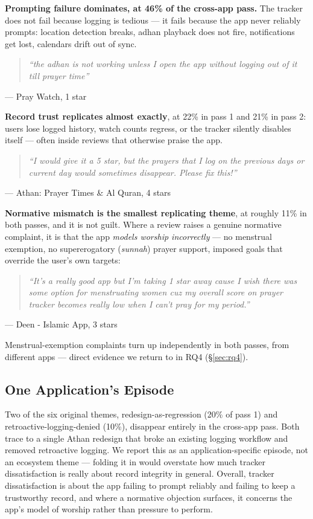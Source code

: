 \textbf{Prompting failure dominates, at 46\% of the cross-app pass.} The
tracker does not fail because logging is tedious --- it fails because the app
never reliably prompts: location detection breaks, adhan playback does not
fire, notifications get lost, calendars drift out of sync.

\begin{quote}
\itshape ``the adhan is not working unless I open the app without logging out
of it till prayer time''
\end{quote}
\hspace*{1em}--- Pray Watch, 1 star

\textbf{Record trust replicates almost exactly}, at 22\% in pass 1 and 21\% in
pass 2: users lose logged history, watch counts regress, or the tracker
silently disables itself --- often inside reviews that otherwise praise the
app.

\begin{quote}
\itshape ``I would give it a 5 star, but the prayers that I log on the
previous days or current day would sometimes disappear. Please fix this!''
\end{quote}
\hspace*{1em}--- Athan: Prayer Times \& Al Quran, 4 stars

\textbf{Normative mismatch is the smallest replicating theme}, at roughly 11\%
in both passes, and it is not guilt. Where a review raises a genuine normative
complaint, it is that the app \emph{models worship incorrectly} --- no
menstrual exemption, no supererogatory (\emph{sunnah}) prayer support, imposed
goals that override the user's own targets:

\begin{quote}
\itshape ``It's a really good app but I'm taking 1 star away cause I wish
there was some option for menstruating women cuz my overall score on prayer
tracker becomes really low when I can't pray for my period.''
\end{quote}
\hspace*{1em}--- Deen - Islamic App, 3 stars

Menstrual-exemption complaints turn up independently in both passes, from
different apps --- direct evidence we return to in RQ4 (\S\ref{sec:rq4}).

\subsection{One Application's Episode}

Two of the six original themes, redesign-as-regression (20\% of pass 1) and
retroactive-logging-denied (10\%), disappear entirely in the cross-app pass.
Both trace to a single Athan redesign that broke an existing logging workflow
and removed retroactive logging. We report this as an application-specific
episode, not an ecosystem theme --- folding it in would overstate how much
tracker dissatisfaction is really about record integrity in general. Overall,
tracker dissatisfaction is about the app failing to prompt reliably and failing
to keep a trustworthy record, and where a normative objection surfaces, it
concerns the app's model of worship rather than pressure to perform.
